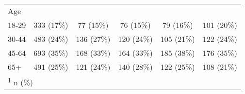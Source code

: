 \begin{table}[H]
{\begin{tabular}[t]{lccccc}
Age &  &  &  &  & \\
\hspace{1em}18-29 & 333 (17\%) & 77 (15\%) & 76 (15\%) & 79 (16\%) & 101 (20\%)\\
\hspace{1em}30-44 & 483 (24\%) & 136 (27\%) & 120 (24\%) & 105 (21\%) & 122 (24\%)\\
\hspace{1em}45-64 & 693 (35\%) & 168 (33\%) & 164 (33\%) & 185 (38\%) & 176 (35\%)\\
\hspace{1em}65+ & 491 (25\%) & 121 (24\%) & 140 (28\%) & 122 (25\%) & 108 (21\%)\\
\bottomrule
\multicolumn{6}{l}{\rule{0pt}{1em}\textsuperscript{1} n (\%)}\\
\end{tabular}}
\end{table}
